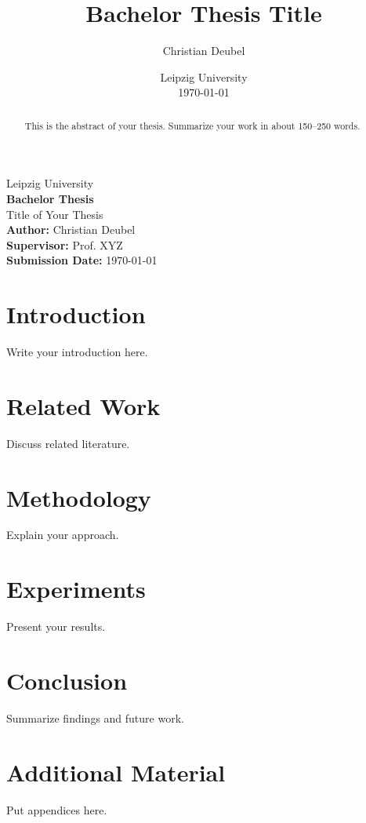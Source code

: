 \documentclass[12pt]{report}
\title{Bachelor Thesis Title}
\author{Christian Deubel}
\date{Leipzig University\\\today}
\begin{document}
\begin{titlepage}
    \centering
    \vspace*{2cm}
    {\Large Leipzig University\\[0.5cm]}
    {\huge\bfseries Bachelor Thesis\\[1cm]}
    {\Large Title of Your Thesis\\[2cm]}
    \textbf{Author:} Christian Deubel\\
    \textbf{Supervisor:} Prof. XYZ\\
    \textbf{Submission Date:} \today
    \vfill
\end{titlepage}

\begin{abstract}
This is the abstract of your thesis. Summarize your work in about 150–250 words.
\end{abstract}

\tableofcontents
\newpage

\chapter{Introduction}
Write your introduction here.

\chapter{Related Work}
Discuss related literature.

\chapter{Methodology}
Explain your approach.

\chapter{Experiments}
Present your results.

\chapter{Conclusion}
Summarize findings and future work.




\appendix
\chapter{Additional Material}
Put appendices here.
\end{document}
